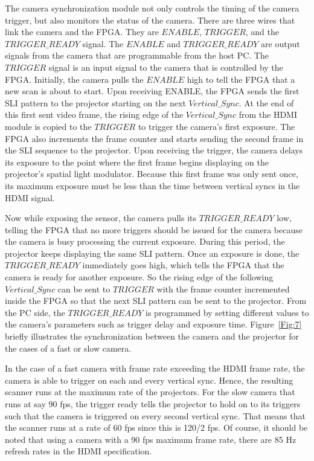 \documentclass[]{spie}  %
\begin{document}
The camera synchronization module not only controls the timing of the camera trigger, but also monitors the status of the camera. There are three wires that link the camera and the FPGA. They are $ENABLE$, $TRIGGER$, and the $TRIGGER\_READY$ signal. The $ENABLE$ and $TRIGGER\_READY$ are output signals from the camera that are programmable from the host PC. The $TRIGGER$ signal is an input signal to the camera that is controlled by the FPGA. Initially, the camera pulls the $ENABLE$ high to tell the FPGA that a new scan is about to start. Upon receiving ENABLE, the FPGA sends the first SLI pattern to the projector starting on the next $Vertical\_Sync$. At the end of this first sent video frame, the rising edge of the $Vertical\_Sync$ from the HDMI module is copied to the $TRIGGER$ to trigger the camera's first exposure.  The FPGA also increments the frame counter and starts sending the second frame in the SLI sequence to the projector.  Upon receiving the trigger, the camera delays its exposure to the point where the first frame begins displaying on the projector's spatial light modulator.  Because this first frame was only sent once, its maximum exposure must be less than the time between vertical syncs in the HDMI signal. 

Now while exposing the sensor, the camera pulls its $TRIGGER\_READY$ low, telling the FPGA that no more triggers should be issued for the camera because the camera is busy processing the current exposure. During this period, the projector keeps displaying the same SLI pattern. Once an exposure is done, the $TRIGGER\_READY$ immediately goes high,  which tells the FPGA that the camera is ready for another exposure. So the rising edge of the following $Vertical\_Sync$ can be sent to $TRIGGER$ with the frame counter incremented inside the FPGA so that the next SLI pattern can be sent to the projector. From the PC side, the $TRIGGER\_READY$ is programmed by setting different values to the camera's parameters such as trigger delay and exposure time. Figure~\ref{Fig:7} briefly illustrates the synchronization between the camera and the projector for the cases of a fast or slow camera. 

In the case of a fast camera with frame rate exceeding the HDMI frame rate, the camera is able to trigger on each and every vertical sync.  Hence, the resulting scanner runs at the maximum rate of the projectors.  For the slow camera that runs at say 90 fps, the trigger ready tells the projector to hold on to its triggers such that the camera is triggered on every second vertical sync.  That means that the scanner runs at a rate of 60 fps since this is 120/2 fps. Of course, it should be noted that using a camera with a 90 fps maximum frame rate, there are 85 Hz refresh rates in the HDMI specification.
\end{document}
